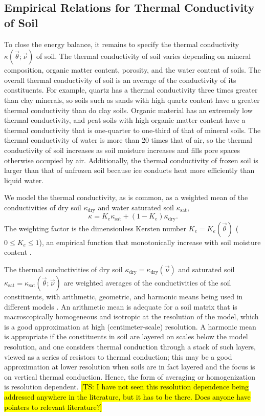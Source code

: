 \documentclass{report}
\begin{document}
\subsection{Empirical Relations for Thermal Conductivity of Soil}

To close the energy balance, it remains to specify the thermal conductivity $\kappa(\vec{\theta}; \vec{\nu})$ of soil. The thermal conductivity of soil varies depending on mineral composition, organic matter content, porosity, and the water content of soils. The overall thermal conductivity of soil is an average of the conductivity of its constituents. For example, quartz has a thermal conductivity three times greater than clay minerals, so soils such as sands with high quartz content have a greater thermal conductivity than do clay soils. Organic material has an extremely low thermal conductivity, and peat soils with high organic matter content have a thermal conductivity that is one-quarter to one-third of that of mineral soils. The thermal conductivity of water is more than 20 times that of air, so the thermal conductivity of soil increases as soil moisture increases and fills pore spaces otherwise occupied by air. Additionally, the thermal conductivity of frozen soil is larger than that of unfrozen soil because ice conducts heat more efficiently than liquid water. 

We model the thermal conductivity, as is common, as a weighted mean of the conductivities of dry soil $\kappa_{\mathrm{dry}}$ and water saturated soil $\kappa_{\mathrm{sat}}$,
\begin{equation}\label{e:soil_conductivity}
\kappa = K_e \kappa_{\mathrm{sat}} + (1-K_e) \kappa_{\mathrm{dry}}.
\end{equation}
The weighting factor is the dimensionless Kersten number $K_e = K_e(\vec{\theta})$ ($0 \le K_e \le 1$), an empirical function that monotonically increase with soil moisture content \citep{Farouki81a,Dai19a}. 

The thermal conductivities of dry soil $\kappa_{\mathrm{dry}} = \kappa_{\mathrm{dry}}(\vec{\nu})$ and saturated soil $\kappa_{\mathrm{sat}} = \kappa_{\mathrm{sat}}(\vec{\theta}; \vec{\nu})$ are weighted averages of the conductivities of the soil constituents, with arithmetic, geometric, and harmonic means being used in different models \citep{Dai19a}. An arithmetic mean is adequate for a soil matrix that is macroscopically homogeneous and isotropic at the resolution of the model, which is a good approximation at high (centimeter-scale) resolution. A harmonic mean is appropriate if the constituents in soil are layered on scales below the model resolution, and one considers thermal conduction through a stack of such layers, viewed as a series of resistors to thermal conduction; this may be a good approximation at lower resolution when soils are in fact layered and the focus is on vertical thermal conduction. Hence, the form of averaging or homogenization is resolution dependent. \hl{[TS: I have not seen this resolution dependence being addressed anywhere in the literature, but it has to be there. Does anyone have pointers to relevant literature?]}
\end{document}
